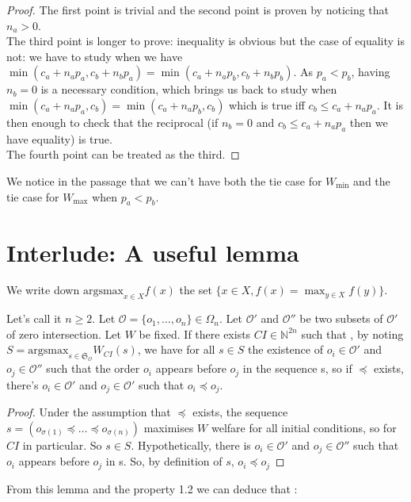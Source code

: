 \documentclass[a4paper]{article}
\newcommand{\N}{\mathbb{N}}
\newcommand{\Sg}{\mathfrak{S}}
\newcommand{\Oc}{\mathcal{O}}
\newcommand{\argsmax}{\mathrm{argsmax}}
\newtheorem[style=S, bodystyle=\noindent]{thm}{Theorem}[section]
\newtheorem[style=S, bodystyle=\noindent]{defn}[thm]{Definition}
\newtheorem[style=S, bodystyle=\noindent]{propo}[thm]{Proposition}
\newtheorem[style=S, bodystyle=\noindent]{prop}[thm]{Property}
\newtheorem[style=S, bodystyle=\noindent]{coro}[thm]{Corollary}
\newtheorem[style=S, bodystyle=\noindent]{lem}[thm]{Lemma}
\newtheorem[style=S, headstyle=\bfseries\boldmath Theorem, bodystyle=\noindent]{thm*}{Theorem}
\newtheorem[style=S, headstyle=\bfseries\boldmath Definition, bodystyle=\noindent]{defn*}{Definition}
\newtheorem[style=S, headstyle=\bfseries\boldmath Proposition, bodystyle=\noindent]{propo*}{Proposition}
\newtheorem[style=S, headstyle=\bfseries\boldmath Property, bodystyle=\noindent]{prop*}{Property}
\newtheorem[style=S, headstyle=\bfseries\boldmath Corollary, bodystyle=\noindent]{coro*}{Corollary}
\newtheorem[style=S, headstyle=\bfseries\boldmath Lemma, bodystyle=\noindent]{lem*}{Lemma}
\begin{document}
\begin{proof}
The first point is trivial and the second point is proven by noticing that $n_a > 0$. \\
The third point is longer to prove: inequality is obvious but the case of equality is not: we have to study when we have $\min(c_a + n_ap_a, c_b + n_bp_a) = \min(c_a + n_ap_b, c_b + n_bp_b)$. As $p_a < p_b$, having $n_b = 0$ is a necessary condition, which brings us back to study when $\min(c_a + n_ap_a, c_b) = \min(c_a + n_ap_b, c_b)$ which is true iff $c_b \leq c_a + n_ap_a$. It is then enough to check that the reciprocal (if $n_b = 0$ and $c_b \leq c_a + n_ap_a$ then we have equality) is true. \\
The fourth point can be treated as the third.
\end{proof}

We notice in the passage that we can't have both the tie case for $W_{\min}$ and the tie case for $W_{\max}$ when $p_a < p_b$.

 \section{Interlude: A useful lemma}

We write down $\argsmax_{x\in X}f(x)$ the set $\{x \in X, f(x) = \max_{y\in X}f(y)\}$.

\begin{lem}
	\label{lem1}
	Let's call it $n \geq 2$. Let $\Oc = \{o_1, \ldots, o_n\} \in \Omega_n$. Let $\Oc'$ and $\Oc''$ be two subsets of $\Oc'$ of zero intersection. Let $W$ be fixed.
	If there exists $CI \in \N^{2n}$ such that , by noting $S = \argsmax_{s \in \Sg_\Oc}W_{CI}(s)$, we have for all $s \in S$ the existence of $o_i\in\Oc'$ and $o_j\in\Oc''$ such that the order $o_i$ appears before $o_j$ in the sequence s, so if $\preceq$ exists, there's $o_i\in\Oc'$ and $o_j\in\Oc'$ such that $o_i \preceq o_j$.
\end{lem}

\begin{proof}
    Under the assumption that $\preceq$ exists, the sequence $s = (o_{\sigma(1)} \preceq \ldots \preceq o_{\sigma(n)})$ maximises $W$ welfare for all initial conditions, so for $CI$ in particular. So $s \in S$. Hypothetically, there is $o_i \in \Oc'$ and $o_j \in \Oc''$ such that $o_i$ appears before $o_j$ in s. So, by definition of $s$, $o_i \preceq o_j$
\end{proof}

From this lemma and the property 1.2 we can deduce that :
\end{document}
